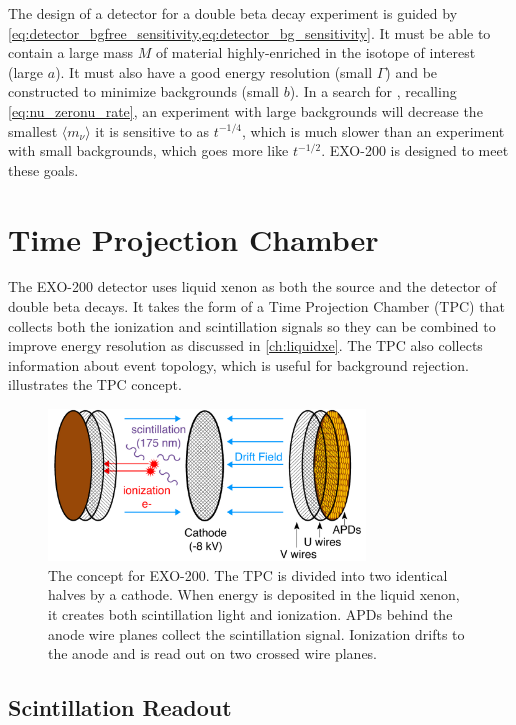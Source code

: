 \documentclass[herrin-thesis.tex]{subfiles}
\begin{document}
The design of a detector for a double beta decay experiment is guided by \cref{eq:detector_bgfree_sensitivity,eq:detector_bg_sensitivity}. It must be able to contain a large mass \(M\) of material highly-enriched in the isotope of interest (large \(a\)). It must also have a good energy resolution (small \(\Gamma\)) and be constructed to minimize backgrounds (small \(b\)). In a search for \zeronu{}, recalling \cref{eq:nu_zeronu_rate}, an experiment with large backgrounds will decrease the smallest  \(\langle m_{\nu} \rangle\) it is sensitive to as \(t^{-1/4}\), which is much slower than an experiment with small backgrounds, which goes more like \(t^{-1/2}\). EXO-200 is designed to meet these goals.

\section{Time Projection Chamber}
The EXO-200 detector uses liquid xenon as both the source and the detector of double beta decays. It takes the form of a Time Projection Chamber (TPC) that collects both the ionization and scintillation signals so they can be combined to improve energy resolution as discussed in \cref{ch:liquidxe}. The TPC also collects information about event topology, which is useful for background rejection.  illustrates the TPC concept.
\begin{figure}
\centering
\includegraphics[width=0.75\textwidth]{./figures/detector_tpc_schematic.pdf}
\caption[A conceptual drawing of EXO-200]{The concept for EXO-200. The TPC is divided into two identical halves by a cathode. When energy is deposited in the liquid xenon, it creates both scintillation light and ionization. APDs behind the anode wire planes collect the scintillation signal. Ionization drifts to the anode and is read out on two crossed wire planes.}
\label{fig:detector_tpc_cartoon}
\end{figure}

\subsection{Scintillation Readout}
\end{document}
